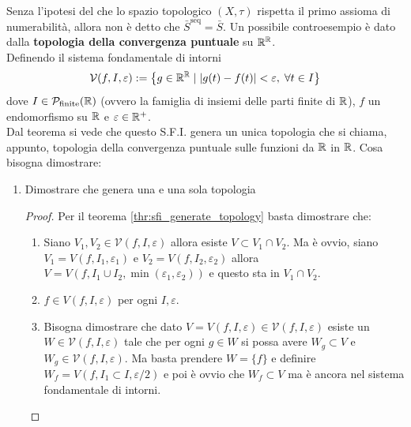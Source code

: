 \begin{remark}
	Senza l'ipotesi del che lo spazio topologico $(X,\tau)$ rispetta il primo assioma di numerabilità, allora non è detto che $\bar{S}^\text{seq} = \bar{S}$. Un possibile controesempio è dato dalla \textbf{topologia della convergenza puntuale} su $\mathbb{R}^{\mathbb{R}}$. \\
	Definendo il sistema fondamentale di intorni 
	\begin{equation}
	\begin{aligned}
		\mathcal{V}(f, I, \varepsilon) := \left\{ g \in \mathbb{R}^{\mathbb{R}} \; | \;  |g(t) - f(t)| < \varepsilon, \; \forall t \in I \right\}
	\end{aligned} 
	\end{equation}
	dove $I \in \mathcal{P}_\text{finite}(\mathbb{R})$ (ovvero la famiglia di insiemi delle parti finite di $\mathbb{R}$), $f$ un endomorfismo su $\mathbb{R}$ e $\varepsilon \in \mathbb{R}^+$. \\
	Dal teorema si vede che questo S.F.I. genera un unica topologia che si chiama, appunto, topologia della convergenza puntuale sulle funzioni da $\mathbb{R}$ in $\mathbb{R}$.
	Cosa bisogna dimostrare:
	\begin{enumerate}
		\item Dimostrare che genera una e una sola topologia 
		\begin{proof}
			Per il teorema \ref{thr:sfi_generate_topology} basta dimostrare che:
			\begin{enumerate}
				\item Siano $V_1, V_2 \in \mathcal{V}(f,I,\varepsilon)$ allora esiste $V \subset V_1 \cap V_2$. Ma è ovvio, siano $V_1 = V(f, I_1, \varepsilon_1)$ e $V_2 = V(f, I_2, \varepsilon_2)$ allora $V = V(f, I_1 \cup I_2, \min(\varepsilon_1, \varepsilon_2))$  e questo sta in $V_1 \cap V_2$.
				\item $f \in V(f, I, \varepsilon)$ per ogni $I, \varepsilon$.
				\item Bisogna dimostrare che dato $V = V(f, I, \varepsilon)\in \mathcal{V}(f,I,\varepsilon)$ esiste un $W \in \mathcal{V}(f,I,\varepsilon)$ tale che per ogni $g \in W$ si possa avere $W_g \subset V$ e $W_g \in \mathcal{V}(f,I, \varepsilon)$. Ma basta prendere $W = \{f\}$ e definire $W_f = V(f, I_1 \subset I, \varepsilon/2)$ e poi è ovvio che $W_f \subset V$ ma è ancora nel sistema fondamentale di intorni.
			\end{enumerate}

\end{proof}
\end{enumerate}
\end{remark}
